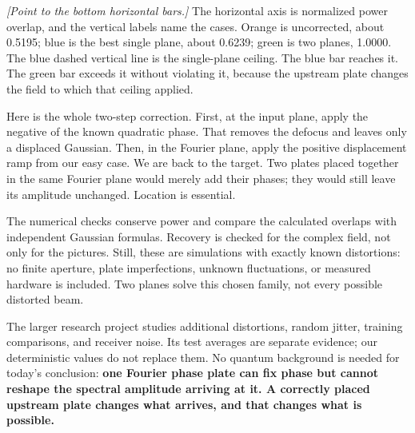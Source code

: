 \documentclass[11pt,a4paper]{article}
\newcommand{\cue}[1]{{\small\color{blue!55!black}\textit{[#1]}}}
\begin{document}
\cue{Point to the bottom horizontal bars.}
The horizontal axis is normalized power overlap, and the vertical labels name the cases. Orange is uncorrected, about 0.5195; blue is the best single plane, about 0.6239; green is two planes, 1.0000. The blue dashed vertical line is the single-plane ceiling. The blue bar reaches it. The green bar exceeds it without violating it, because the upstream plate changes the field to which that ceiling applied.

Here is the whole two-step correction. First, at the input plane, apply the negative of the known quadratic phase. That removes the defocus and leaves only a displaced Gaussian. Then, in the Fourier plane, apply the positive displacement ramp from our easy case. We are back to the target. Two plates placed together in the same Fourier plane would merely add their phases; they would still leave its amplitude unchanged. Location is essential.

The numerical checks conserve power and compare the calculated overlaps with independent Gaussian formulas. Recovery is checked for the complex field, not only for the pictures. Still, these are simulations with exactly known distortions: no finite aperture, plate imperfections, unknown fluctuations, or measured hardware is included. Two planes solve this chosen family, not every possible distorted beam.

The larger research project studies additional distortions, random jitter, training comparisons, and receiver noise. Its test averages are separate evidence; our deterministic values do not replace them. No quantum background is needed for today's conclusion: \textbf{one Fourier phase plate can fix phase but cannot reshape the spectral amplitude arriving at it. A correctly placed upstream plate changes what arrives, and that changes what is possible.}
\end{document}
